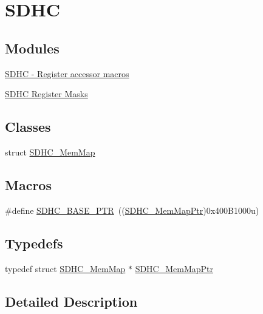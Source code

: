 \hypertarget{group___s_d_h_c___peripheral}{}\section{S\+D\+HC}
\label{group___s_d_h_c___peripheral}
\subsection*{Modules}
\begin{DoxyCompactItemize}
\item 
\hyperlink{group___s_d_h_c___register___accessor___macros}{S\+D\+H\+C -\/ Register accessor macros}
\item 
\hyperlink{group___s_d_h_c___register___masks}{S\+D\+H\+C Register Masks}
\end{DoxyCompactItemize}
\subsection*{Classes}
\begin{DoxyCompactItemize}
\item 
struct \hyperlink{struct_s_d_h_c___mem_map}{S\+D\+H\+C\+\_\+\+Mem\+Map}
\end{DoxyCompactItemize}
\subsection*{Macros}
\begin{DoxyCompactItemize}
\item 
\#define \hyperlink{group___s_d_h_c___peripheral_gaf6d94732d48040eef799143f86be859c}{S\+D\+H\+C\+\_\+\+B\+A\+S\+E\+\_\+\+P\+TR}~((\hyperlink{group___s_d_h_c___peripheral_ga6da8531f7cf8afb4899b93b54ac58054}{S\+D\+H\+C\+\_\+\+Mem\+Map\+Ptr})0x400\+B1000u)
\end{DoxyCompactItemize}
\subsection*{Typedefs}
\begin{DoxyCompactItemize}
\item 
typedef struct \hyperlink{struct_s_d_h_c___mem_map}{S\+D\+H\+C\+\_\+\+Mem\+Map} $\ast$ \hyperlink{group___s_d_h_c___peripheral_ga6da8531f7cf8afb4899b93b54ac58054}{S\+D\+H\+C\+\_\+\+Mem\+Map\+Ptr}
\end{DoxyCompactItemize}


\subsection{Detailed Description}


